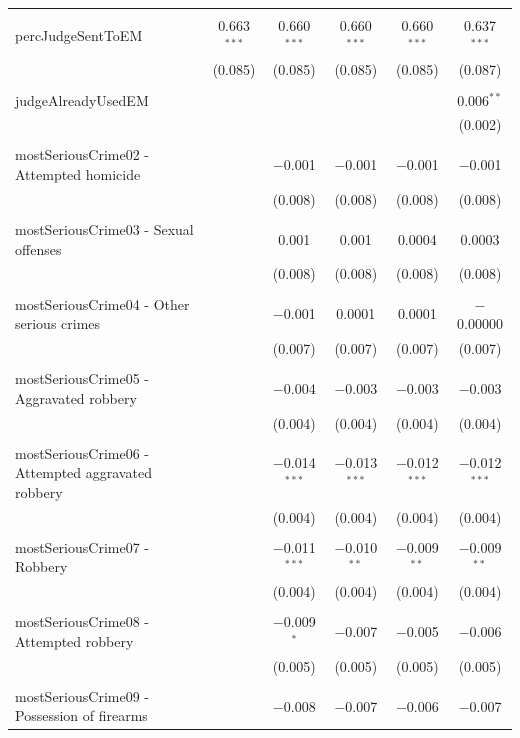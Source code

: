 \documentclass[a4paper,12pt]{article}
\begin{document}
\begin{table}[!htbp]
{\begin{tabular}{@{\extracolsep{5pt}}lccccc}
\hline \\[-1.8ex] 
 percJudgeSentToEM & 0.663$^{***}$ & 0.660$^{***}$ & 0.660$^{***}$ & 0.660$^{***}$ & 0.637$^{***}$ \\ 
  & (0.085) & (0.085) & (0.085) & (0.085) & (0.087) \\ 
  & & & & & \\ 
 judgeAlreadyUsedEM &  &  &  &  & 0.006$^{**}$ \\ 
  &  &  &  &  & (0.002) \\ 
  & & & & & \\ 
 mostSeriousCrime02 - Attempted homicide &  & $-$0.001 & $-$0.001 & $-$0.001 & $-$0.001 \\ 
  &  & (0.008) & (0.008) & (0.008) & (0.008) \\ 
  & & & & & \\ 
 mostSeriousCrime03 - Sexual offenses &  & 0.001 & 0.001 & 0.0004 & 0.0003 \\ 
  &  & (0.008) & (0.008) & (0.008) & (0.008) \\ 
  & & & & & \\ 
 mostSeriousCrime04 - Other serious crimes &  & $-$0.001 & 0.0001 & 0.0001 & $-$0.00000 \\ 
  &  & (0.007) & (0.007) & (0.007) & (0.007) \\ 
  & & & & & \\ 
 mostSeriousCrime05 - Aggravated robbery &  & $-$0.004 & $-$0.003 & $-$0.003 & $-$0.003 \\ 
  &  & (0.004) & (0.004) & (0.004) & (0.004) \\ 
  & & & & & \\ 
 mostSeriousCrime06 - Attempted aggravated robbery &  & $-$0.014$^{***}$ & $-$0.013$^{***}$ & $-$0.012$^{***}$ & $-$0.012$^{***}$ \\ 
  &  & (0.004) & (0.004) & (0.004) & (0.004) \\ 
  & & & & & \\ 
 mostSeriousCrime07 - Robbery &  & $-$0.011$^{***}$ & $-$0.010$^{**}$ & $-$0.009$^{**}$ & $-$0.009$^{**}$ \\ 
  &  & (0.004) & (0.004) & (0.004) & (0.004) \\ 
  & & & & & \\ 
 mostSeriousCrime08 - Attempted robbery &  & $-$0.009$^{*}$ & $-$0.007 & $-$0.005 & $-$0.006 \\ 
  &  & (0.005) & (0.005) & (0.005) & (0.005) \\ 
  & & & & & \\ 
 mostSeriousCrime09 - Possession of firearms &  & $-$0.008 & $-$0.007 & $-$0.006 & $-$0.007 \\ 

\end{tabular}}
\end{table}
\end{document}
